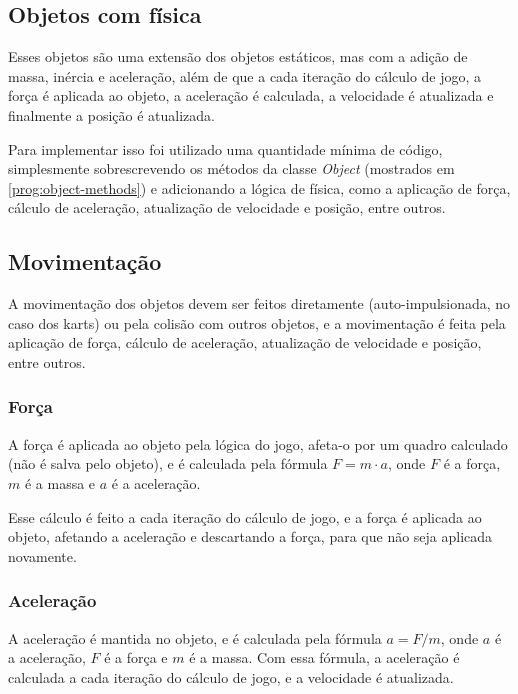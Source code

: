 \subsection{Objetos com física}

Esses objetos são uma extensão dos objetos estáticos, mas com a adição de massa, inércia e aceleração, além de que a cada iteração do cálculo de jogo, a força é aplicada ao objeto, a aceleração é calculada, a velocidade é atualizada e finalmente a posição é atualizada.

Para implementar isso foi utilizado uma quantidade mínima de código, simplesmente sobrescrevendo os métodos da classe \textit{Object} (mostrados em \ref{prog:object-methods}) e adicionando a lógica de física, como a aplicação de força, cálculo de aceleração, atualização de velocidade e posição, entre outros.

\subsection{Movimentação}

A movimentação dos objetos devem ser feitos diretamente (auto-impulsionada, no caso dos karts) ou pela colisão com outros objetos, e a movimentação é feita pela aplicação de força, cálculo de aceleração, atualização de velocidade e posição, entre outros.

\subsubsection{Força}

A força é aplicada ao objeto pela lógica do jogo, afeta-o por um quadro calculado (não é salva pelo objeto), e é calculada pela fórmula $F = m \cdot a$, onde $F$ é a força, $m$ é a massa e $a$ é a aceleração.

Esse cálculo é feito a cada iteração do cálculo de jogo, e a força é aplicada ao objeto, afetando a aceleração e descartando a força, para que não seja aplicada novamente.

\subsubsection{Aceleração}

A aceleração é mantida no objeto, e é calculada pela fórmula $a = F / m$, onde $a$ é a aceleração, $F$ é a força e $m$ é a massa. Com essa fórmula, a aceleração é calculada a cada iteração do cálculo de jogo, e a velocidade é atualizada.

